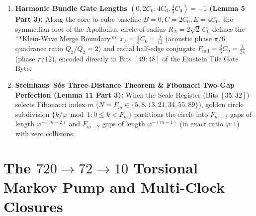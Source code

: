 \documentclass[11pt, a4paper]{article}
\begin{document}
\begin{enumerate}
    \item \textbf{Harmonic Bundle Gate Lengths $(0, 2C_0; 4C_0, \frac{4}{3}C_0) = -1$ (Lemma 5 Part 3):}
    Along the core-to-cube baseline $B = 0, C = 2C_0, E = 4C_0$, the symmedian foot of the Apollonius circle of radius $R_A = 2\sqrt{2}\,C_0$ defines the **Klein-Wave Merge Boundary** $x_F = \frac{4}{3}C_0 = \frac{\lambda}{12}$ (acoustic phase $\pi/6$, quadrance ratio $Q_3/Q_2 = 2$) and radial half-edge conjugate $F_{\text{rad}} = \frac{2}{3}C_0 = \frac{\lambda}{24}$ (phase $\pi/12$), encoded directly in Bits $[49:48]$ of the Einstein Tile Gate Byte.
    \item \textbf{Steinhaus--S\'os Three-Distance Theorem \& Fibonacci Two-Gap Perfection (Lemma 11 Part 3):}
    When the Scale Register (Bits $[35:32]$) selects Fibonacci index $m$ ($N = F_m \in \{5, 8, 13, 21, 34, 55, 89\}$), golden circle subdivision $\{k/\varphi \bmod 1 : 0 \le k < F_m\}$ partitions the circle into $F_{m-1}$ gaps of length $\varphi^{-(m-2)}$ and $F_{m-2}$ gaps of length $\varphi^{-(m-1)}$ (in exact ratio $\varphi : 1$) with zero collisions.
\end{enumerate}

\section{The \texorpdfstring{$720 \to 72 \to 10$}{720 -> 72 -> 10} Torsional Markov Pump and Multi-Clock Closures}
\end{document}
